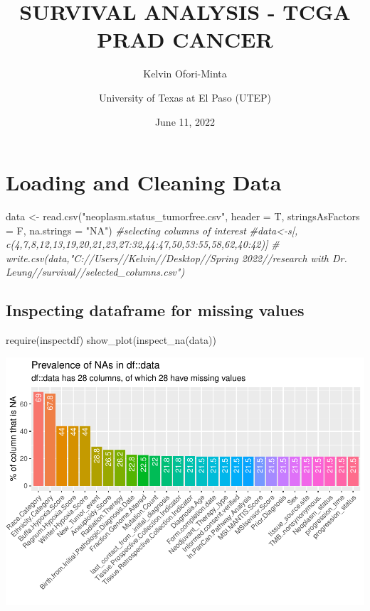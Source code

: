 \documentclass[
  11pt,
]{article}
\title{SURVIVAL ANALYSIS - TCGA PRAD CANCER}
\author{Kelvin Ofori-Minta \and University of Texas at El Paso (UTEP)}
\date{June 11, 2022}
\newenvironment{Shaded}{\begin{snugshade}}{\end{snugshade}}
\newcommand{\AttributeTok}[1]{\textcolor[rgb]{0.77,0.63,0.00}{#1}}
\newcommand{\CommentTok}[1]{\textcolor[rgb]{0.56,0.35,0.01}{\textit{#1}}}
\newcommand{\FunctionTok}[1]{\textcolor[rgb]{0.00,0.00,0.00}{#1}}
\newcommand{\NormalTok}[1]{#1}
\newcommand{\OtherTok}[1]{\textcolor[rgb]{0.56,0.35,0.01}{#1}}
\newcommand{\StringTok}[1]{\textcolor[rgb]{0.31,0.60,0.02}{#1}}
\begin{document}
\maketitle

{
\setcounter{tocdepth}{4}
\tableofcontents
}
\newpage
\section{Loading and Cleaning Data}

\begin{Shaded}
\begin{Highlighting}[]
\NormalTok{data }\OtherTok{\textless{}{-}} \FunctionTok{read.csv}\NormalTok{(}\StringTok{"neoplasm.status\_tumorfree.csv"}\NormalTok{, }\AttributeTok{header =}\NormalTok{ T, }\AttributeTok{stringsAsFactors =}\NormalTok{ F,}
              \AttributeTok{na.strings =} \StringTok{"NA"}\NormalTok{)}
\CommentTok{\#selecting columns of interest}
\CommentTok{\#data\textless{}{-}s[, c(4,7,8,12,13,19,20,21,23,27:32,44:47,50,53:55,58,62,40:42)]}
\CommentTok{\# write.csv(data,"C://Users//Kelvin//Desktop//Spring 2022//research with Dr. Leung//survival//selected\_columns.csv")}
\end{Highlighting}
\end{Shaded}

\subsection{Inspecting dataframe for missing values}

\begin{Shaded}
\begin{Highlighting}[]
\FunctionTok{require}\NormalTok{(inspectdf)}
\FunctionTok{show\_plot}\NormalTok{(}\FunctionTok{inspect\_na}\NormalTok{(data))}
\end{Highlighting}
\end{Shaded}

\includegraphics{new_surv_3_files/figure-latex/unnamed-chunk-2-1.pdf}
\end{document}
